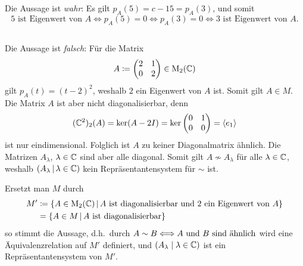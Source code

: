 \subsection{}

Die Aussage ist \emph{wahr}:
Es gilt $p_A(5) = c-15 = p_A(3)$, und somit
\[
        \text{$5$ ist Eigenwert von $A$}
  \iff  p_A(5) = 0
  \iff  p_A(3) = 0
  \iff  \text{$3$ ist Eigenwert von $A$}.
\]





\subsection{}

Die Aussage ist \emph{falsch}:
Für die Matrix
\[
            A
  \coloneqq \begin{pmatrix}
              2 & 1
            \\
              0 & 2
            \end{pmatrix}
  \in       \matrices{2}{\complex}
\]
gilt $p_A(t) = (t-2)^2$, weshalb $2$ ein Eigenwert von $A$ ist.
Somit gilt $A \in M$.
Die Matrix $A$ ist aber nicht diagonalisierbar, denn
\[
    \eigenspace{(\complex^2)}{A}{2}
  = \ker (A - 2I)
  = \ker \begin{pmatrix}
           0 & 1
          \\
           0 & 0
         \end{pmatrix}
  = \generated{e_1}
\]
ist nur eindimensional.
Folglich ist $A$ zu keiner Diagonalmatrix ähnlich.
Die Matrizen $A_\lambda$, $\lambda \in \complex$ sind aber alle diagonal.
Somit gilt $A \nsim A_\lambda$ für alle $\lambda \in \complex$, weshalb $(A_\lambda \suchthat \lambda \in \complex)$ kein Repräsentantensystem für ${\sim}$ ist.

\begin{remark}
  Ersetzt man $M$ durch
  \begin{align*}
              M'
    &\coloneqq  \{
                  A \in \matrices{2}{\complex}
                \suchthat
                  \text{$A$ ist diagonalisierbar und $2$ ein Eigenwert von $A$}
                \}
    \\
    &=          \{
                  A \in M
                \suchthat
                  \text{$A$ ist diagonalisierbar}
                \}
  \end{align*}
  so stimmt die Aussage, d.h.\ durch $A \sim B \coloniff \text{$A$ und $B$ sind ähnlich}$ wird eine Äquivalenzrelation auf $M'$ definiert, und $(A_\lambda \mid \lambda \in \complex)$ ist ein Repräsentantensystem von $M'$.
\end{remark}












